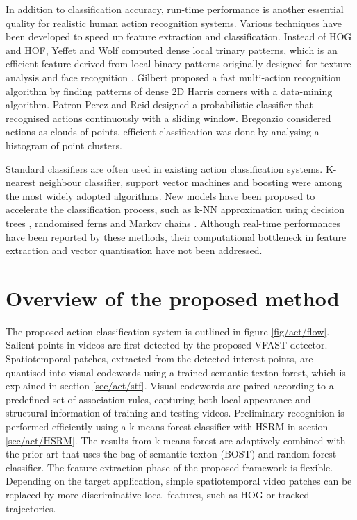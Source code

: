 In addition to classification accuracy, run-time performance is another essential quality for realistic human action recognition systems. Various techniques have been developed to speed up feature extraction and classification. 
Instead of HOG and HOF, Yeffet and Wolf \cite{Yeffet2009} computed dense local trinary patterns, which is an efficient feature derived from local binary patterns originally designed for texture analysis and face recognition \cite{Ahonen2006}. 
Gilbert \etal \cite{Gilbert2009} proposed a fast multi-action recognition algorithm by finding patterns of dense 2D Harris corners with a data-mining algorithm.
Patron-Perez and Reid \cite{Patron2007} designed a probabilistic classifier that recognised actions continuously with a sliding window. 
Bregonzio \etal \cite{Bregonzio2009} considered actions as clouds of points, efficient classification was done by analysing a histogram of point clusters. 

Standard classifiers are often used in existing action classification systems. 
K-nearest neighbour classifier, support vector machines and boosting were among the most widely adopted algorithms. New models have been proposed to accelerate the classification process, such as k-NN approximation using decision trees \cite{Lin2009}, randomised ferns \cite{Oshin2009} and Markov chains \cite{Messing2009}.   
Although real-time performances have been reported by these methods, their computational bottleneck in feature extraction and vector quantisation have not been addressed. 

\section{Overview of the proposed method} 
\label{sec/act/overview}

The proposed action classification system is outlined in figure \ref{fig/act/flow}. 
Salient points in videos are first detected by the proposed VFAST detector. 
Spatiotemporal patches, extracted from the detected interest points, are quantised into visual codewords using a trained semantic texton forest, which is explained in section \ref{sec/act/stf}. 
Visual codewords are paired according to a predefined set of association rules, capturing both local appearance and structural information of training and testing videos.  
Preliminary recognition is performed efficiently using a k-means forest classifier with HSRM in section \ref{sec/act/HSRM}. 
The results from k-means forest are adaptively combined with the prior-art that uses the bag of semantic texton (BOST) and random forest classifier.
The feature extraction phase of the proposed framework is flexible. 
Depending on the target application, simple spatiotemporal video patches can be replaced by more discriminative local features, such as HOG or tracked trajectories.

